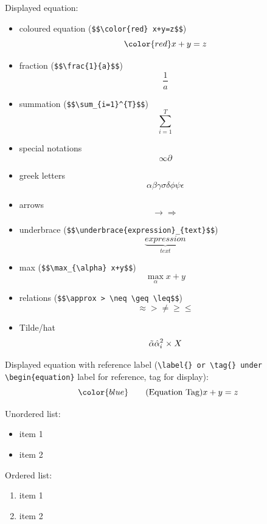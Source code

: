             Displayed equation:
            \begin{itemize}
                \item coloured equation (\verb!$$\color{red} x+y=z$$!)$$\color{red} x+y=z$$  
                \item fraction (\verb|$$\frac{1}{a}$$|)$$\frac{1}{a}$$
                \item summation (\verb|$$\sum_{i=1}^{T}$$|)$$\sum_{i=1}^{T}$$
                \item special notations $$\infty \partial$$
                \item greek letters $$\alpha \beta \gamma \sigma \delta \phi \psi \epsilon$$
                \item arrows $$\rightarrow \Rightarrow$$
                \item underbrace (\verb|$$\underbrace{expression}_{text}$$|)$$\underbrace{expression}_{text}$$
                \item max (\verb|$$\max_{\alpha} x+y$$|)$$\max_{\alpha} x+y$$
                \item relations (\verb|$$\approx > \neq \geq \leq$$|)$$\approx > \neq \geq \leq$$
                \item Tilde/hat $$\Tilde{\alpha} \hat{\alpha}_i^2 \times X$$
            \end{itemize}

            Displayed equation with reference label (\verb|\label{} or \tag{} under \begin{equation}| label for reference, tag for display):
            \begin{equation}
                \color{blue}%
                \label{eqn:1}%
                \tag{Equation Tag}%
                x+y=z
            \end{equation}

            Unordered list:
            \begin{itemize}
                \item item 1
                \item item 2
            \end{itemize}
            
            Ordered list:
            \begin{enumerate}
                \item item 1
                \item item 2
            \end{enumerate}
            
